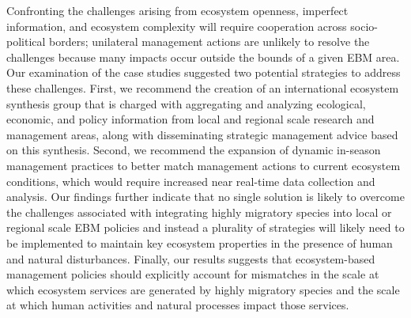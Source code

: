 Confronting the challenges arising from ecosystem openness, imperfect
information, and ecosystem complexity will require cooperation across
socio-political borders; unilateral management actions are unlikely to resolve
the challenges because many impacts occur outside the bounds of a given EBM
area. Our examination of the case studies suggested two potential strategies to
address these challenges. First, we recommend the creation of an international
ecosystem synthesis group that is charged with aggregating and analyzing
ecological, economic, and policy information from local and regional scale
research and management areas, along with disseminating strategic management
advice based on this synthesis. Second, we recommend the expansion of dynamic
in-season management practices to better match management actions to current
ecosystem conditions, which would require increased near real-time data
collection and analysis. Our findings further indicate that no single solution
is likely to overcome the challenges associated with integrating highly
migratory species into local or regional scale EBM policies and instead a
plurality of strategies will likely need to be implemented to maintain key
ecosystem properties in the presence of human and natural disturbances. Finally,
our results suggests that ecosystem-based management policies should explicitly
account for mismatches in the scale at which ecosystem services are generated by
highly migratory species and the scale at which human activities and natural
processes impact those services.

